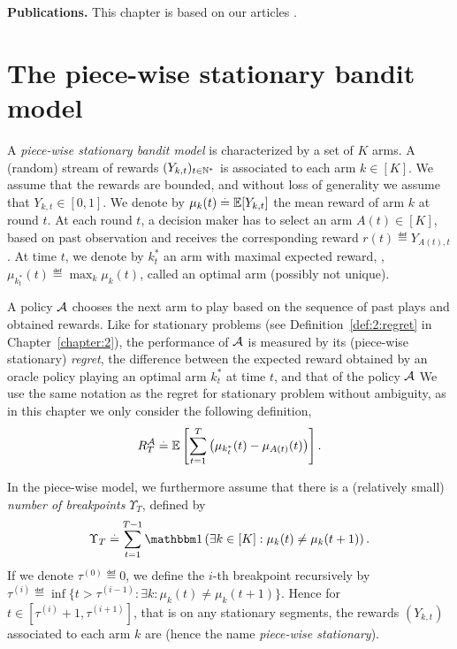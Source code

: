 \textbf{Publications.}
%
This chapter is based on our articles \cite{Besson2019GLRT,Besson2019Gretsi}.


\section{The piece-wise stationary bandit model}
\label{sec:6:BanditSetting}

A \emph{piece-wise stationary bandit model} is characterized by a set of $K$ arms.
A (random) stream of rewards $(Y_{k,t})_{t\in\mathbb{N}^*}$ is associated to each arm $k \in [K]$. We assume that the rewards are bounded, and without loss of generality we assume that $Y_{k,t} \in [0,1]$.
We denote by $\mu_k(t) \overset{.}{=}  \mathbb{E}[Y_{k,t}]$ the mean reward of arm $k$ at round $t$. At each round $t$, a decision maker has to select an arm $A(t)\in[K]$, based on past observation and receives the corresponding reward $r(t) \eqdef Y_{A(t),t}$.
At time $t$, we denote by $k_t^*$ an arm with maximal expected reward, \ie, $\mu_{k_t^*}(t) \eqdef \max_k \mu_k(t)$, called an optimal arm (possibly not unique).

A policy $\mathcal{A}$ chooses the next arm to play based on the sequence of past plays and obtained rewards.
Like for stationary problems (see Definition~\ref{def:2:regret} in Chapter~\ref{chapter:2}), the performance of $\mathcal{A}$ is measured by its (piece-wise stationary) \emph{regret}, the difference between the expected reward obtained by an oracle policy playing an optimal arm $k_t^*$ at time $t$, and that of the policy $\mathcal{A}$
We use the same notation as the regret for stationary problem without ambiguity, as in this chapter we only consider the following definition,
%
\begin{equation}\label{def:6:regret}
    R_T^{\mathcal{A}} \overset{.}{=} \mathbb{E}\left[\sum_{t=1}^T \left(\mu_{k_t^*}(t) - \mu_{A(t)}(t)\right)\right].
\end{equation}


In the piece-wise \iid{} model, we furthermore assume that there is a (relatively small) \emph{number of breakpoints} $\Upsilon_T$, defined by
\begin{equation}\label{def:6:breakpoints}
    \Upsilon_T \eqdef \sum_{t=1}^{T-1} \indic\left(\exists k\in[K]: \mu_k(t) \neq \mu_k(t+1)\right).
\end{equation}
If we denote $\tau^{(0)} \eqdef 0$, we define the $i$-th breakpoint recursively by
$\tau^{(i)} \eqdef \inf\{t > \tau^{(i-1)} : \exists k : \mu_k(t) \neq \mu_k(t+1)\}$.
%
Hence for $t\in[\tau^{(i)} + 1,\tau^{(i+1)}]$, that is on any stationary segments, the rewards $(Y_{k,t})$ associated to each arm $k$ are \iid{} (hence the name \emph{piece-wise stationary}).

